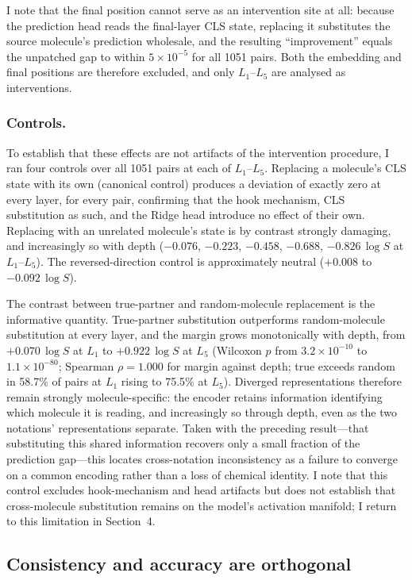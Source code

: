 \documentclass[twoside,twocolumn,9pt]{article}
\newcommand{\logS}{\ensuremath{\log S}}
\begin{document}
I note that the final position cannot serve as an intervention site at all: because the prediction head reads the final-layer CLS state, replacing it substitutes the source molecule's prediction wholesale, and the resulting ``improvement'' equals the unpatched gap to within $5\!\times\!10^{-5}$ for all 1051 pairs. Both the embedding and final positions are therefore excluded, and only $L_1$--$L_5$ are analysed as interventions.

\subsubsection{Controls.~~} To establish that these effects are not artifacts of the intervention procedure, I ran four controls over all 1051 pairs at each of $L_1$--$L_5$. Replacing a molecule's CLS state with its own (canonical control) produces a deviation of exactly zero at every layer, for every pair, confirming that the hook mechanism, CLS substitution as such, and the Ridge head introduce no effect of their own. Replacing with an unrelated molecule's state is by contrast strongly damaging, and increasingly so with depth ($-0.076$, $-0.223$, $-0.458$, $-0.688$, $-0.826$\,$\logS$ at $L_1$--$L_5$). The reversed-direction control is approximately neutral ($+0.008$ to $-0.092$\,$\logS$).

The contrast between true-partner and random-molecule replacement is the informative quantity. True-partner substitution outperforms random-molecule substitution at every layer, and the margin grows monotonically with depth, from $+0.070\,\logS$ at $L_1$ to $+0.922\,\logS$ at $L_5$ (Wilcoxon $p$ from $3.2\!\times\!10^{-10}$ to $1.1\!\times\!10^{-80}$; Spearman $\rho=1.000$ for margin against depth; true exceeds random in 58.7\% of pairs at $L_1$ rising to 75.5\% at $L_5$). Diverged representations therefore remain strongly molecule-specific: the encoder retains information identifying which molecule it is reading, and increasingly so through depth, even as the two notations' representations separate. Taken with the preceding result---that substituting this shared information recovers only a small fraction of the prediction gap---this locates cross-notation inconsistency as a failure to converge on a common encoding rather than a loss of chemical identity. I note that this control excludes hook-mechanism and head artifacts but does not establish that cross-molecule substitution remains on the model's activation manifold; I return to this limitation in Section~4.

\subsection{Consistency and accuracy are orthogonal}
\end{document}
